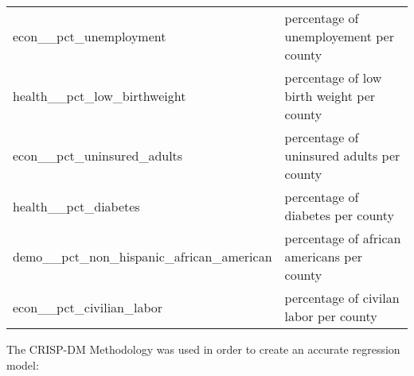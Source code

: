 \documentclass[11pt]{article}
\begin{document}
\begin{longtable}[]{@{}ll@{}}
\begin{minipage}[t]{0.71\columnwidth}
econ\_\_pct\_unemployment\strut
\end{minipage} & \begin{minipage}[t]{0.14\columnwidth}\raggedright\strut
percentage of unemployement per county\strut
\end{minipage}\tabularnewline
\begin{minipage}[t]{0.71\columnwidth}\raggedright\strut
health\_\_pct\_low\_birthweight\strut
\end{minipage} & \begin{minipage}[t]{0.14\columnwidth}\raggedright\strut
percentage of low birth weight per county\strut
\end{minipage}\tabularnewline
\begin{minipage}[t]{0.71\columnwidth}\raggedright\strut
econ\_\_pct\_uninsured\_adults\strut
\end{minipage} & \begin{minipage}[t]{0.14\columnwidth}\raggedright\strut
percentage of uninsured adults per county\strut
\end{minipage}\tabularnewline
\begin{minipage}[t]{0.71\columnwidth}\raggedright\strut
health\_\_pct\_diabetes\strut
\end{minipage} & \begin{minipage}[t]{0.14\columnwidth}\raggedright\strut
percentage of diabetes per county\strut
\end{minipage}\tabularnewline
\begin{minipage}[t]{0.71\columnwidth}\raggedright\strut
demo\_\_pct\_non\_hispanic\_african\_american\strut
\end{minipage} & \begin{minipage}[t]{0.14\columnwidth}\raggedright\strut
percentage of african americans per county\strut
\end{minipage}\tabularnewline
\begin{minipage}[t]{0.71\columnwidth}\raggedright\strut
econ\_\_pct\_civilian\_labor\strut
\end{minipage} & \begin{minipage}[t]{0.14\columnwidth}\raggedright\strut
percentage of civilan labor per county\strut
\end{minipage}\tabularnewline
\bottomrule
\end{longtable}

The CRISP-DM Methodology was used in order to create an accurate
regression model:
\end{document}
